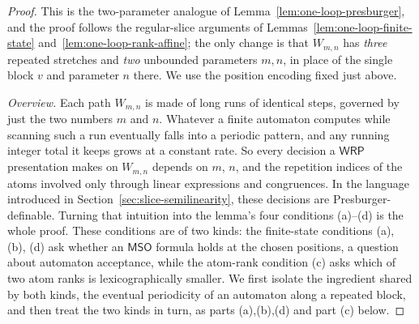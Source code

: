 \documentclass[10pt,a4paper]{amsart}
\newcommand{\MSO}{\mathsf{MSO}}
\newcommand{\WRP}{\mathsf{WRP}}
\begin{document}
\begin{proof}
This is the two-parameter analogue of
Lemma~\ref{lem:one-loop-presburger}, and the proof follows the regular-slice
arguments of Lemmas~\ref{lem:one-loop-finite-state}
and~\ref{lem:one-loop-rank-affine}; the only change is that $W_{m,n}$ has
\emph{three} repeated stretches and \emph{two} unbounded parameters $m,n$, in
place of the single block $v$ and parameter $n$ there.  We use the position
encoding fixed just above.

\vspace{0.5em}
\noindent\emph{Overview.}  Each path $W_{m,n}$ is made of long runs of
identical steps, governed by just the two numbers $m$ and $n$.  Whatever a finite
automaton computes while scanning such a run eventually falls into a periodic
pattern, and any running integer total it keeps grows at a constant rate.  So
every decision a $\WRP$ presentation makes on $W_{m,n}$ depends on $m$, $n$, and
the repetition indices of the atoms involved only through linear expressions and
congruences.  In the language introduced in
Section~\ref{sec:slice-semilinearity}, these decisions are
Presburger-definable.  Turning
that intuition into the lemma's four conditions (a)--(d) is the whole proof.
These conditions are of two kinds: the finite-state conditions (a), (b), (d) ask
whether an $\MSO$ formula holds at the chosen positions, a question about
automaton acceptance, while the atom-rank condition (c) asks which of two atom
ranks is lexicographically smaller.  We first isolate the ingredient shared by
both kinds, the eventual
periodicity of an automaton along a repeated block, and then treat the two kinds
in turn, as parts (a),(b),(d) and part (c) below.


\end{proof}
\end{document}
